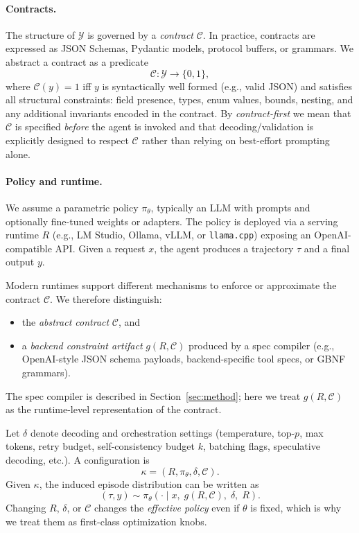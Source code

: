 \documentclass[11pt]{article}
\begin{document}
\paragraph{Contracts.}
The structure of $\mathcal{Y}$ is governed by a \emph{contract} $\mathcal{C}$.
In practice, contracts are expressed as JSON Schemas, Pydantic models, protocol buffers, or grammars.
We abstract a contract as a predicate
\[
\mathcal{C}:\mathcal{Y}\rightarrow\{0,1\},
\]
where $\mathcal{C}(y)=1$ iff $y$ is syntactically well formed (e.g., valid JSON) and satisfies all structural constraints:
field presence, types, enum values, bounds, nesting, and any additional invariants encoded in the contract.
By \emph{contract-first} we mean that $\mathcal{C}$ is specified \emph{before} the agent is invoked and that decoding/validation is explicitly designed to respect $\mathcal{C}$ rather than relying on best-effort prompting alone.

\paragraph{Policy and runtime.}
We assume a parametric policy $\pi_\theta$, typically an LLM with prompts and optionally fine-tuned weights or adapters.
The policy is deployed via a serving runtime $R$ (e.g., LM Studio, Ollama, vLLM, or \texttt{llama.cpp}) exposing an OpenAI-compatible API.
Given a request $x$, the agent produces a trajectory $\tau$ and a final output $y$.

Modern runtimes support different mechanisms to enforce or approximate the contract $\mathcal{C}$.
We therefore distinguish:
\begin{itemize}[leftmargin=12pt]
    \item the \emph{abstract contract} $\mathcal{C}$, and
    \item a \emph{backend constraint artifact} $g(R,\mathcal{C})$ produced by a spec compiler (e.g., OpenAI-style JSON schema payloads, backend-specific tool specs, or GBNF grammars).
\end{itemize}
The spec compiler is described in Section~\ref{sec:method}; here we treat $g(R,\mathcal{C})$ as the runtime-level representation of the contract.

Let $\delta$ denote decoding and orchestration settings (temperature, top-$p$, max tokens, retry budget, self-consistency budget $k$, batching flags, speculative decoding, etc.).
A configuration is
\[
\kappa = (R,\pi_\theta,\delta,\mathcal{C}).
\]
Given $\kappa$, the induced episode distribution can be written as
\[
(\tau,y) \sim \pi_\theta(\cdot \mid x,\; g(R,\mathcal{C}),\; \delta,\; R).
\]
Changing $R$, $\delta$, or $\mathcal{C}$ changes the \emph{effective policy} even if $\theta$ is fixed, which is why we treat them as first-class optimization knobs.
\end{document}
